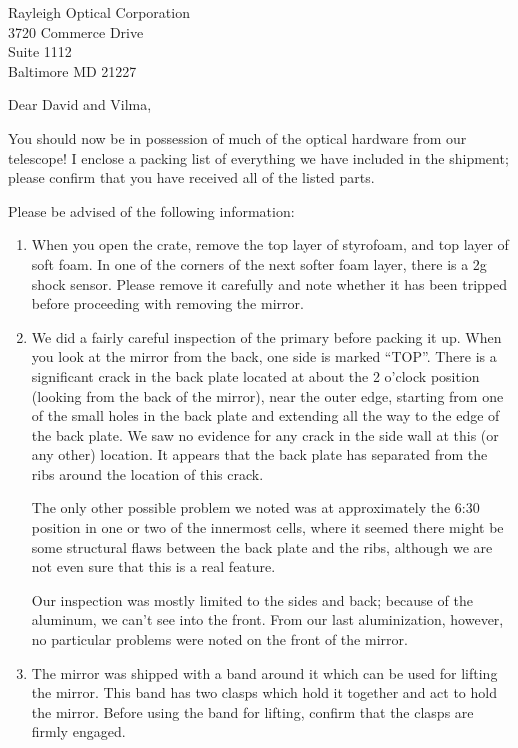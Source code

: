 \documentclass{letter}
\begin{document}
\begin{letter}
{
Rayleigh Optical Corporation\\
3720 Commerce Drive\\
Suite 1112\\
Baltimore MD 21227 
}
\opening{Dear David and Vilma,}

  You should now be in possession of much of the optical hardware from our
telescope! I enclose a packing list of everything we have included in
the shipment; please confirm that you have received all of the listed parts.

  Please be advised of the following information:



\begin{enumerate}
  \item When you open the crate, remove the top layer of styrofoam, and top
   layer of soft foam. In one of the
   corners of the next softer foam layer, there is a 2g shock sensor. Please
   remove it carefully and note whether it has been tripped before proceeding
   with removing the mirror.

  \item We did a fairly careful inspection of the primary before packing it up.
   When you look at the mirror from the back, one side is marked ``TOP''. 
   There is a significant crack in the back plate located at about the
   2 o'clock position (looking from the back of the mirror), near the outer
   edge, starting from one of the small holes in the back plate and 
   extending all the way to the edge of the back plate. We saw no evidence
   for any crack in the side wall at this (or any other) location. It 
   appears that the back plate has separated from the ribs around the location
   of this crack.

   The only other possible problem we noted was at approximately the 6:30
   position in one or two of the innermost cells, where it seemed there might
   be some structural flaws between the back plate and the ribs, although
   we are not even sure that this is a real feature.
  
   Our inspection was mostly limited to the sides and back; because of the
   aluminum, we can't see into the front. From our last aluminization,
   however, no particular problems were noted on the front of the mirror.

  \item The mirror was shipped with a band around it which can be used
   for lifting the mirror. This band has two clasps which hold it
   together and act to hold the mirror. Before using the band for lifting,
   confirm that the clasps are firmly engaged.


\end{enumerate}
\end{letter}
\end{document}
